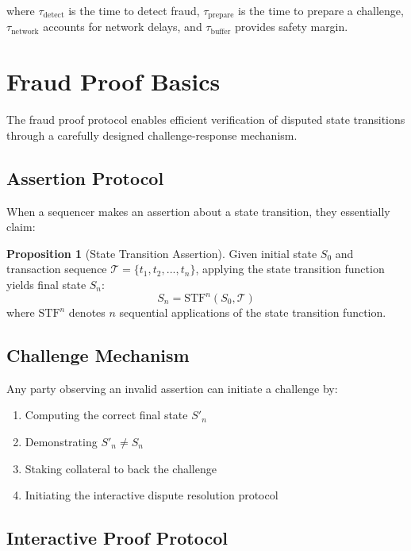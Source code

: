 \documentclass[11pt,a4paper]{article}
\theoremstyle{definition}
\newtheorem{proposition}{Proposition}[section]
\begin{document}
where $\tau_{\text{detect}}$ is the time to detect fraud, $\tau_{\text{prepare}}$ is the time to prepare a challenge, $\tau_{\text{network}}$ accounts for network delays, and $\tau_{\text{buffer}}$ provides safety margin.

\section{Fraud Proof Basics}

The fraud proof protocol enables efficient verification of disputed state transitions through a carefully designed challenge-response mechanism.

\subsection{Assertion Protocol}

When a sequencer makes an assertion about a state transition, they essentially claim:

\begin{proposition}[State Transition Assertion]
Given initial state $S_0$ and transaction sequence $\mathcal{T} = \{t_1, t_2, ..., t_n\}$, applying the state transition function yields final state $S_n$:
\begin{equation}
S_n = \text{STF}^n(S_0, \mathcal{T})
\end{equation}
where $\text{STF}^n$ denotes $n$ sequential applications of the state transition function.
\end{proposition}

\subsection{Challenge Mechanism}

Any party observing an invalid assertion can initiate a challenge by:

\begin{enumerate}
    \item Computing the correct final state $S'_n$
    \item Demonstrating $S'_n \neq S_n$
    \item Staking collateral to back the challenge
    \item Initiating the interactive dispute resolution protocol
\end{enumerate}

\subsection{Interactive Proof Protocol}
\end{document}
